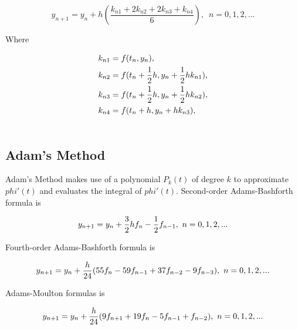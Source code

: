\documentclass[a4paper]{article}
\begin{document}
		\begin{equation}\label{eq.4}
		y_{n+1} = y_n + h(\frac{k_{n1} + 2k_{n2} + 2k_{n3} + k_{n4} }{6}), \enspace n = 0, 1, 2,...
	\end{equation}

	Where
	
	\begin{align} \nonumber
		k_{n1} &= f(t_n, y_n), \\ \nonumber
		k_{n2} &= f(t_n + {1 \over 2}h, y_n + {1 \over 2}hk_{n1}), \\ \nonumber
		k_{n3} &= f(t_n + {1 \over 2}h, y_n + {1 \over 2}hk_{n2}), \\ \nonumber
		k_{n4} &= f(t_n + h, y_n + hk_{n3}), \\ \nonumber
	\end{align}
	
	
	\subsection{Adam’s Method}
	
	Adam’s Method makes use of a polynomial $P_k(t)$ of degree $k$ to approximate $phi'(t)$ and evaluates the integral of $phi'(t)$.
	Second-order Adams-Bashforth formula is
	
	\begin{equation}\label{eq.6}
		y_{n+1} = y_n + {3 \over 2}hf_n - {1 \over 2}f_{n-1}, \  n = 0,1,2,...
	\end{equation}
	
	Fourth-order Adams-Bashforth formula is
	
	\begin{equation}\label{eq.7}
		y_{n+1} = y_n + {h \over 24}(55f_n - 59f_{n-1} + 37f_{n-2} - 9f_{n-3}), \  n = 0,1,2,...
	\end{equation}
	
	Adams-Moulton formulas is
	
	\begin{equation}\label{eq.7}
		y_{n+1} = y_n + {h \over 24}(9f_{n+1} + 19f_{n} - 5f_{n-1} + f_{n-2}), \  n = 0,1,2,...
	\end{equation}
	
	
	
	
	
\end{document}
